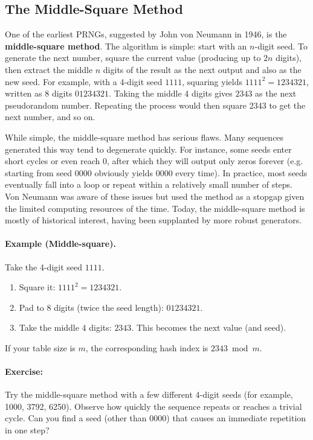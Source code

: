 \documentclass[11pt]{article}
\begin{document}
\subsection{The Middle-Square Method}
One of the earliest PRNGs, suggested by John von Neumann in 1946, is the \textbf{middle-square method}. The algorithm is simple: start with an $n$-digit seed. To generate the next number, square the current value (producing up to $2n$ digits), then extract the middle $n$ digits of the result as the next output and also as the new seed. For example, with a 4-digit seed $1111$, squaring yields $1111^2 = 1234321$, written as 8 digits $01234321$. Taking the middle 4 digits gives $2343$ as the next pseudorandom number. Repeating the process would then square 2343 to get the next number, and so on.

While simple, the middle-square method has serious flaws. Many sequences generated this way tend to degenerate quickly. For instance, some seeds enter short cycles or even reach 0, after which they will output only zeros forever (e.g. starting from seed 0000 obviously yields 0000 every time). In practice, most seeds eventually fall into a loop or repeat within a relatively small number of steps. Von Neumann was aware of these issues but used the method as a stopgap given the limited computing resources of the time. Today, the middle-square method is mostly of historical interest, having been supplanted by more robust generators.

\paragraph{Example (Middle-square).}
Take the 4-digit seed \(1111\).
\begin{enumerate}
  \item Square it: \(1111^2 = 1234321\).
  \item Pad to 8 digits (twice the seed length): \(01234321\).
  \item Take the middle 4 digits: \(\boxed{2343}\). This becomes the next value (and seed).
\end{enumerate}
If your table size is \(m\), the corresponding hash index is \(2343 \bmod m\).

\paragraph{Exercise:} Try the middle-square method with a few different 4-digit seeds (for example, 1000, 3792, 6250). Observe how quickly the sequence repeats or reaches a trivial cycle. Can you find a seed (other than 0000) that causes an immediate repetition in one step?
\end{document}
